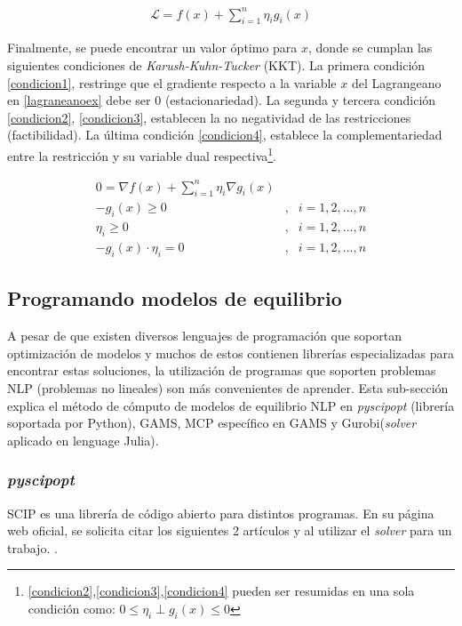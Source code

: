 \begin{align}
    \mathcal{L}=f(x) +  \sum_{i=1}^{n}\eta_{i}g_{i}(x)\label{lagraneanoex}
\end{align}

Finalmente, se puede encontrar un valor óptimo para $x$, donde se cumplan las siguientes condiciones de \textit{Karush-Kuhn-Tucker} (KKT). La primera condición \ref{condicion1}, restringe que el gradiente respecto a la variable $x$ del Lagrangeano en \ref{lagraneanoex} debe ser 0 (estacionariedad). La segunda y tercera condición \ref{condicion2}, \ref{condicion3}, establecen la no negatividad de las restricciones (factibilidad). La última condición \ref{condicion4}, establece la complementariedad entre la restricción y su variable dual respectiva\footnote{\ref{condicion2},\ref{condicion3},\ref{condicion4} pueden ser resumidas en una sola condición como: $0\leq\eta_{i}\perp g_{i}(x)\leq 0$}. 

\begin{align}
    0 = \nabla f(x) + \sum_{i=1}^{n} \eta_{i}\nabla g_{i}(x) \label{condicion1}\\
    -g_{i}(x) \geq 0 &, & i=1,2,...,n  \label{condicion2}\\
    \eta_{i} \geq 0 &, & i=1,2,...,n \label{condicion3}\\
    -g_{i}(x)\cdot \eta_{i} = 0 &, & i=1,2,...,n \label{condicion4}
\end{align}

\subsection{Programando modelos de equilibrio}\label{explisolvers}

A pesar de que existen diversos lenguajes de programación que soportan optimización de modelos y muchos de estos contienen librerías especializadas para encontrar estas soluciones, la utilización de programas que soporten problemas NLP (problemas no lineales) son más convenientes de aprender. Esta sub-sección explica el método de cómputo de modelos de equilibrio NLP en \textit{pyscipopt} (librería soportada por Python), GAMS, MCP específico en GAMS y Gurobi(\textit{solver} aplicado en lenguage Julia).

\subsubsection{\textit{pyscipopt}}

SCIP es una librería de código abierto para distintos programas. En su página web oficial, se solicita citar los siguientes 2 artículos 
y  al utilizar el \textit{solver} para un trabajo. . 
\vspace{2.5mm}

